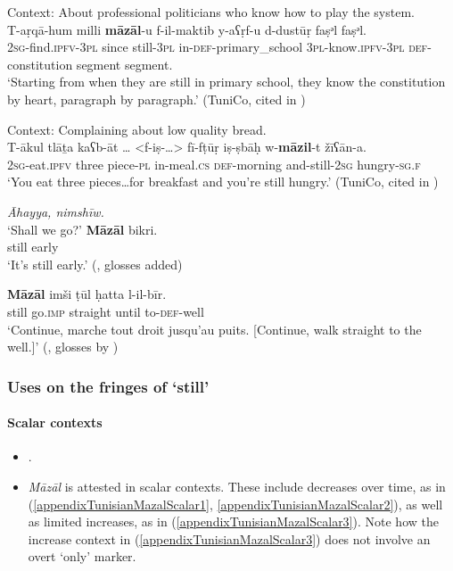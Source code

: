 \begin{exe}
	\ex Context: About professional politicians who know how to play the system.\\
	\gll T-aṛqā-hum	milli	\textbf{māzāl}-u	 f-il-maktib y-aʕṛf-u d-dustūṛ	 faṣᵊl	faṣᵊl.\\
	2\textsc{sg}-find.\textsc{ipfv}-3\textsc{pl} since still-3\textsc{pl} in-\textsc{def}-primary\_school 3\textsc{pl}-know.\textsc{ipfv}-3\textsc{pl} \textsc{def}-constitution segment segment.\\
	\glt \lq Starting from when they are still in primary school, they know the constitution by heart, paragraph by paragraph.\rq{ }(TuniCo, cited in \cite{FischerEtAlTunisian})
	
	\ex Context: Complaining about low quality bread.\\
	\gll T-ākul tlāṯa	kaʕb-āt …  <f-iṣ-…> fī-fṭūṛ	iṣ-ṣbāḥ w-\textbf{māzil}-t žīʕān-a.\\
	2\textsc{sg}-eat.\textsc{ipfv} three piece-\textsc{pl} {} {} in-meal.\textsc{cs} \textsc{def}-morning and-still-2\textsc{sg} hungry-\textsc{sg}.\textsc{f}\\
	\glt \lq You eat three pieces…for breakfast and you’re still hungry.\rq{ }(TuniCo, cited in \cite{FischerEtAlTunisian})
	\ex
	\begin{xlist}
		\textit{Āhayya, nimshīw.}\\
		\lq Shall we go?\rq
		\gll \textbf{Māzāl} bikri.\\
		still early\\
		\glt \lq It's still early.\rq{ }(\cite[221]{Amor1990}, glosses added)
	\end{xlist}
	
	\ex\label{exAppendixTunisian3}
	\gll \textbf{Māzāl}	imši	ṭūl		ḥatta	l-il-bīr.\\
	still go.\textsc{imp} 	straight	until	to-\textsc{def}-well\\
	\glt \lq Continue, marche tout droit jusqu’au puits. [Continue, walk straight to the well.]\rq{ }(\cite[1737]{MarcaisGuiga19581961}, glosses by \cite{FischerEtAlTunisian})	
\end{exe}


\subsubsection{Uses on the fringes of \lq{}still\rq}
\paragraph{Scalar contexts}
\label{appendixTunisianMazalScalar}
\begin{itemize}
	\item \textcite{FischerEtAlTunisian}.
	\item \textit{Māzāl} is attested in scalar contexts. These include decreases over time, as in (\ref{appendixTunisianMazalScalar1}, \ref{appendixTunisianMazalScalar2}), as well as limited increases, as in (\ref{appendixTunisianMazalScalar3}). Note how the increase context  in (\ref{appendixTunisianMazalScalar3}) does not involve an overt \lq only\rq{ }marker.
\end{itemize}

